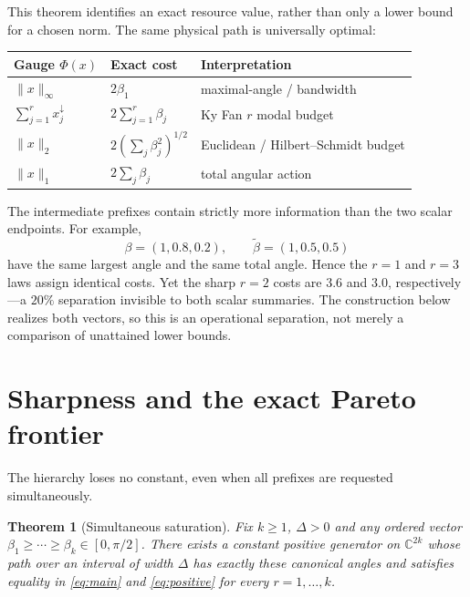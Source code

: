 \documentclass[11pt]{article}
\newtheorem{theorem}{Theorem}[section]
\theoremstyle{definition}
\theoremstyle{remark}
\newcommand{\C}{\mathbb C}
\begin{document}
This theorem identifies an exact resource value, rather than only a lower
bound for a chosen norm.  The same physical path is universally optimal:
\begin{center}
\begin{tabular}{lll}
\toprule
Gauge $\Phi(x)$ & Exact cost & Interpretation\\
\midrule
$\lVert x\rVert_\infty$ & $2\beta_1$ & maximal-angle / bandwidth\\
$\sum_{j=1}^r x_j^\downarrow$ & $2\sum_{j=1}^r\beta_j$ & Ky Fan $r$ modal budget\\
$\lVert x\rVert_2$ & $2(\sum_j\beta_j^2)^{1/2}$ & Euclidean / Hilbert--Schmidt budget\\
$\lVert x\rVert_1$ & $2\sum_j\beta_j$ & total angular action\\
\bottomrule
\end{tabular}
\end{center}

The intermediate prefixes contain strictly more information than the two
scalar endpoints.  For example,
\begin{equation}\label{eq:strictseparation}
 \beta=(1,0.8,0.2),\qquad \widetilde\beta=(1,0.5,0.5)
\end{equation}
have the same largest angle and the same total angle.  Hence the $r=1$ and
$r=3$ laws assign identical costs.  Yet the sharp $r=2$ costs are $3.6$ and
$3.0$, respectively---a $20\%$ separation invisible to both scalar summaries.
The construction below realizes both vectors, so this is an operational
separation, not merely a comparison of unattained lower bounds.

\section{Sharpness and the exact Pareto frontier}

The hierarchy loses no constant, even when all prefixes are requested
simultaneously.

\begin{theorem}[Simultaneous saturation]\label{thm:sharp}
Fix $k\geq1$, $\Delta>0$ and any ordered vector
$\beta_1\geq\cdots\geq\beta_k\in[0,\pi/2]$.  There exists a constant positive
generator on $\C^{2k}$ whose path over an interval of width $\Delta$ has
exactly these canonical angles and satisfies equality in
\eqref{eq:main} and \eqref{eq:positive} for every $r=1,\ldots,k$.
\end{theorem}
\end{document}
